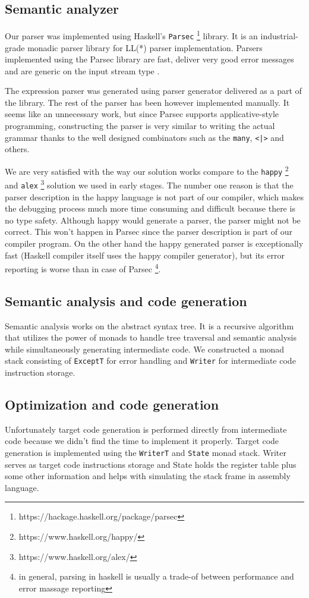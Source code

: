 \documentclass[titlepage]{article}
\begin{document}
\subsection{Semantic analyzer}
Our parser was implemented using Haskell's \texttt{Parsec}
\footnote{https://hackage.haskell.org/package/parsec} library. It is
an industrial-grade monadic parser library for LL(*) parser implementation. Parsers
implemented using the Parsec library are fast, deliver very good error messages and
are generic on the input stream type \cite{parsec}.

The expression parser was generated using parser generator delivered as a part of the
library. The rest of the parser has been however implemented manually. It seems like an
unnecessary work, but since Parsec supports applicative-style programming,
constructing the parser is very similar to writing the actual grammar thanks to the well
designed combinators such as the \texttt{many}, \texttt{<|>} and others.

We are very satisfied with the way our solution works compare to the \texttt{happy}
\footnote{https://www.haskell.org/happy/} \cite{happy} and \texttt{alex}
\footnote{https://www.haskell.org/alex/} solution we used in early stages. The number one
reason is that the parser description in the happy language is not part of our
compiler, which makes the debugging process much more time consuming and difficult
because there is no type safety. Although happy would generate a parser, the parser
might not be correct. This won't happen in Parsec since the parser description is
part of our compiler program.
On the other hand the happy generated parser is exceptionally fast (Haskell compiler
itself uses the happy compiler generator), but its error reporting is worse than in
case of Parsec \footnote{in general, parsing in haskell is usually a trade-of between performance
and error massage reporting}.

\subsection{Semantic analysis and code generation}
Semantic analysis works on the abstract syntax tree. It is a recursive algorithm that
utilizes the power of monads to handle tree traversal and semantic analysis while
simultaneously generating intermediate code. We constructed a monad stack consisting of
\texttt{ExceptT} for error handling and \texttt{Writer} for intermediate code instruction
storage.

\subsection{Optimization and code generation}
Unfortunately target code generation is performed directly from intermediate code because
we didn't find the time to implement it properly. Target code generation is implemented
using the \texttt{WriterT} and \texttt{State} monad stack. Writer serves as target code
instructions storage and State holds the register table plus some other information and
helps with simulating the stack frame in assembly language.
\end{document}
